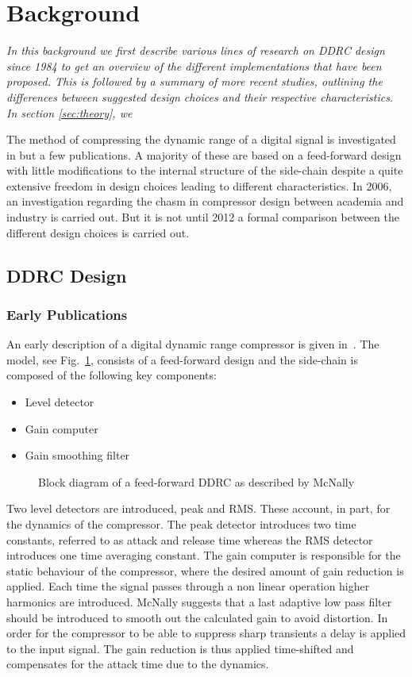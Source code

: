 \documentclass[../main2.tex]{subfiles}
\providecommand{\rootdir}{..}
\begin{document}
\section{Background}
\emph{In this background we first describe various lines of research on DDRC design since 1984 to get an overview of the different implementations that have been proposed. This is followed by a summary of more recent studies, outlining the differences between suggested design choices and their respective characteristics. In section \ref{sec:theory}, we}

The method of compressing the dynamic range of a digital signal is investigated in but a few publications. A majority of these are based on a feed-forward design with little modifications to the internal structure of the side-chain despite a quite extensive freedom in design choices leading to different characteristics.  In 2006, an investigation regarding the chasm in compressor design between academia and industry is carried out. But it is not until 2012 a formal comparison between the different design choices is carried out.

\FloatBarrier
\subsection{DDRC Design}
\subsubsection{Early Publications}
An early description of a digital dynamic range compressor is given in~\cite{mcnally1984dynamic}. The model, see Fig.~\ref{fig:block_mcnally}, consists of a feed-forward  design and the side-chain is composed of the following key components:
\begin{itemize}
\item{Level detector}
\item{Gain computer}
\item{Gain smoothing filter}
\end{itemize}
\begin{figure}

\caption{Block diagram of a feed-forward DDRC as described by McNally}
\label{fig:block_mcnally}
\end{figure}
Two level detectors are introduced, peak and RMS. These account, in part, for the dynamics of the compressor. The peak detector introduces two time constants, referred to as attack and release time whereas the RMS detector introduces one time averaging constant. The gain computer is responsible for the static behaviour of the compressor, where the desired amount of gain reduction is applied. Each time the signal passes through a non linear operation higher harmonics are introduced. McNally suggests that a last adaptive low pass filter should be introduced to smooth out the calculated gain to avoid distortion. In order for the compressor to be able to suppress sharp transients a delay is applied to the input signal. The gain reduction is thus applied time-shifted and compensates for the attack time due to the dynamics.
\end{document}
